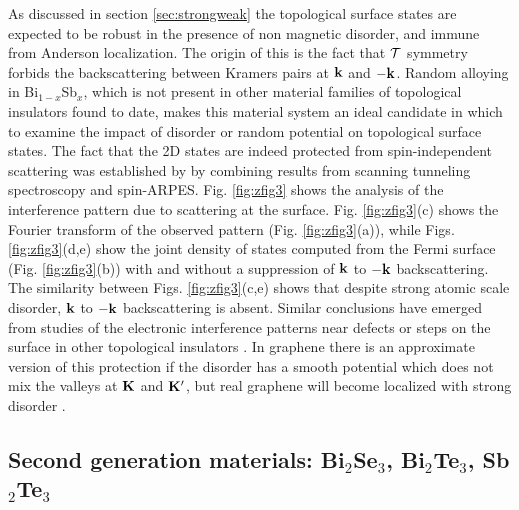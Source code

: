 \documentclass[twocolumn,floatfix,showpacs,rmp,aps]{revtex4}
\begin{document}
	As discussed in section \ref{sec:strongweak}
	the topological surface states are expected to be
	robust in the presence of non magnetic disorder, and immune from
	Anderson localization.  The origin of this is the fact that
	${\cal T}$ symmetry forbids the backscattering between Kramers
	pairs at ${\bf k}$ and $-{\bf k}$.
	Random alloying in Bi$_{1-x}$Sb$_x$,
	which is not present in other material families of topological
	insulators found to date, makes this material system an ideal
	candidate in which to examine the impact of disorder or random
	potential on topological surface states. The fact that the
	2D states are indeed protected from spin-independent
	scattering was established by \textcite{roushan09} by
	combining results from scanning tunneling spectroscopy and
	spin-ARPES.  Fig. \ref{fig:zfig3} shows
	the analysis of the interference pattern
	due to scattering at the surface.
	Fig. \ref{fig:zfig3}(c) shows the Fourier transform of the observed pattern
	(Fig. \ref{fig:zfig3}(a)),
	while Figs. \ref{fig:zfig3}(d,e) show the joint density of states computed from
	the Fermi surface (Fig. \ref{fig:zfig3}(b))
	with and without a suppression of ${\bf k}$ to $-{\bf k}$
	backscattering.  The similarity between Figs. \ref{fig:zfig3}(c,e) shows that
	despite strong atomic scale disorder,
	${\bf k}$ to $-{\bf k}$ backscattering is absent.
	Similar conclusions have emerged from studies of the electronic interference
	patterns near defects or steps on the surface in other topological insulators
	\cite{urazhdin04,zhangt09,alpichshev10}.  In graphene there is an approximate version of
	this protection if the disorder has a smooth potential which does
	not mix the valleys at ${\bf K}$ and ${\bf K}'$, but real graphene
	will become localized with strong disorder \cite{neto09}.
	
	\subsection{Second generation materials: Bi$_2$Se$_3$, Bi$_2$Te$_3$, Sb$_2$Te$_3$}
	\label{sec:bise}
	
\end{document}
